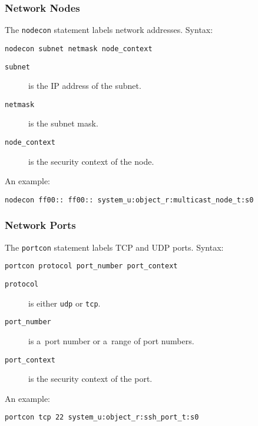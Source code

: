 \subsubsection{Network Nodes}
The \texttt{nodecon} statement labels network addresses. Syntax:
\begin{lstlisting}[language=te]
nodecon subnet netmask node_context
\end{lstlisting}
\begin{description}
    \item [\texttt{subnet}] is the IP address of the subnet.
    \item [\texttt{netmask}] is the subnet mask.
    \item [\texttt{node\_context}] is the security context of the node.
\end{description}
An example:
\begin{lstlisting}[language=te]
nodecon ff00:: ff00:: system_u:object_r:multicast_node_t:s0
\end{lstlisting}

\subsubsection{Network Ports}
The \texttt{portcon} statement labels TCP and UDP ports. Syntax:
\begin{lstlisting}[language=te]
portcon protocol port_number port_context
\end{lstlisting}
\begin{description}
    \item [\texttt{protocol}] is either \texttt{udp} or \texttt{tcp}.
    \item [\texttt{port\_number}] is a~port number or a~range of port numbers.
    \item [\texttt{port\_context}] is the security context of the port.
\end{description}
An example:
\begin{lstlisting}[language=te]
portcon tcp 22 system_u:object_r:ssh_port_t:s0
\end{lstlisting}


